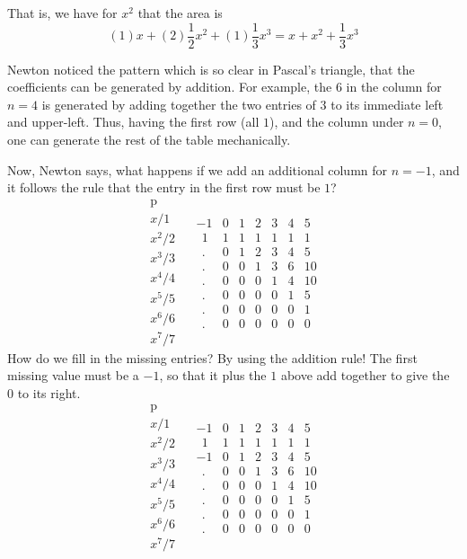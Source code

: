 \documentclass[11pt, oneside]{article}
\begin{document}
That is, we have for $x^2$ that the area is
\[ (1)x + (2)\frac{1}{2}x^2 + (1)\frac{1}{3}x^3 = x + x^2 + \frac{1}{3}x^3 \]

Newton noticed the pattern which is so clear in Pascal's triangle, that the coefficients can be generated by addition.  For example, the $6$ in the column for $n=4$ is generated by adding together the two entries of $3$ to its immediate left and upper-left.  Thus, having the first row (all $1$), and the column under $n=0$, one can generate the rest of the table mechanically.

Now, Newton says, what happens if we add an additional column for $n=-1$, and it follows the rule that the entry in the first row must be $1$?
\[
\begin{matrix}
\text{p}  \\
x/1  \\
x^2/2 \\
x^3/3 \\
x^4/4 \\
x^5/5 \\
x^6/6 \\
x^7/7
\end{matrix} \ \ \ \
\begin{matrix}
-1 & 0 & 1 & 2 & 3 & 4 & 5  \\
\ \ 1 & 1 & 1 & 1 & 1 & 1 & 1  \\
\ \ . & 0 & 1 & 2 & 3 & 4 & 5 \\
\ \ . & 0 & 0 & 1 & 3 & 6 & 10 \\
\ \ . & 0 & 0 & 0 & 1 & 4 & 10 \\
\ \ . & 0 & 0 & 0 & 0 & 1 & 5 \\
\ \ . & 0 & 0 & 0 & 0 & 0 & 1 \\
\ \ . & 0 & 0 & 0 & 0 & 0 & 0
\end{matrix}
\]
How do we fill  in the missing entries?  By using the addition rule!  The first missing value must be a $-1$, so that it plus the $1$ above add together to give the $0$ to its right.
\[
\begin{matrix}
\text{p}  \\
x/1  \\
x^2/2 \\
x^3/3 \\
x^4/4 \\
x^5/5 \\
x^6/6 \\
x^7/7
\end{matrix} \ \ \ \
\begin{matrix}
-1 & 0 & 1 & 2 & 3 & 4 & 5  \\
\ \ 1 & 1 & 1 & 1 & 1 & 1 & 1  \\
-1 & 0 & 1 & 2 & 3 & 4 & 5 \\
\ \ . & 0 & 0 & 1 & 3 & 6 & 10 \\
\ \ . & 0 & 0 & 0 & 1 & 4 & 10 \\
\ \ . & 0 & 0 & 0 & 0 & 1 & 5 \\
\ \ . & 0 & 0 & 0 & 0 & 0 & 1 \\
\ \ . & 0 & 0 & 0 & 0 & 0 & 0
\end{matrix}
\]
\end{document}
